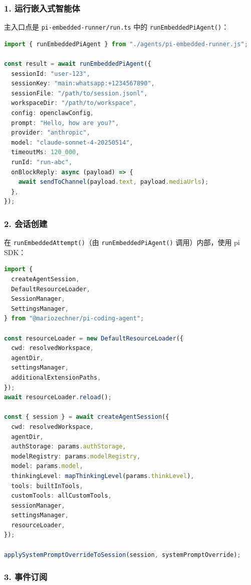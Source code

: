 \subsubsection{1. 运行嵌入式智能体}


主入口点是 \texttt{pi-embedded-runner/run.ts} 中的 \texttt{runEmbeddedPiAgent()}：

\begin{lstlisting}[language=typescript]
import { runEmbeddedPiAgent } from "./agents/pi-embedded-runner.js";

const result = await runEmbeddedPiAgent({
  sessionId: "user-123",
  sessionKey: "main:whatsapp:+1234567890",
  sessionFile: "/path/to/session.jsonl",
  workspaceDir: "/path/to/workspace",
  config: openclawConfig,
  prompt: "Hello, how are you?",
  provider: "anthropic",
  model: "claude-sonnet-4-20250514",
  timeoutMs: 120_000,
  runId: "run-abc",
  onBlockReply: async (payload) => {
    await sendToChannel(payload.text, payload.mediaUrls);
  },
});
\end{lstlisting}


\subsubsection{2. 会话创建}


在 \texttt{runEmbeddedAttempt()}（由 \texttt{runEmbeddedPiAgent()} 调用）内部，使用 pi SDK：

\begin{lstlisting}[language=typescript]
import {
  createAgentSession,
  DefaultResourceLoader,
  SessionManager,
  SettingsManager,
} from "@mariozechner/pi-coding-agent";

const resourceLoader = new DefaultResourceLoader({
  cwd: resolvedWorkspace,
  agentDir,
  settingsManager,
  additionalExtensionPaths,
});
await resourceLoader.reload();

const { session } = await createAgentSession({
  cwd: resolvedWorkspace,
  agentDir,
  authStorage: params.authStorage,
  modelRegistry: params.modelRegistry,
  model: params.model,
  thinkingLevel: mapThinkingLevel(params.thinkLevel),
  tools: builtInTools,
  customTools: allCustomTools,
  sessionManager,
  settingsManager,
  resourceLoader,
});

applySystemPromptOverrideToSession(session, systemPromptOverride);
\end{lstlisting}


\subsubsection{3. 事件订阅}


